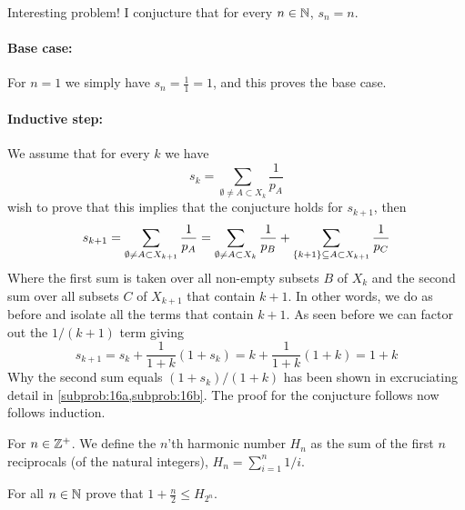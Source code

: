 \documentclass[a4paper, english, 12pt]{article} %
\begin{document}
\begin{answer}
  Interesting problem! I conjucture that for every $n \in \mathbb{N}$, $s_n = n$.
  \paragraph{Base case:} For $n = 1$ we simply have $s_n = \frac{1}{1} = 1$, and
  this proves the base case.
  \paragraph{Inductive step:} We assume that for every $k$ we have
  \begin{equation*}
    s_k = \sum_{\emptyset \neq A \subset X_k} \frac{1}{p_A} 
  \end{equation*}
  wish to prove that this implies that the conjucture holds for $s_{k+1}$, then
  \begin{equation*}
    s_{k+1}
      = \sum_{\emptyset \neq A \subset X_{k+1}} \frac{1}{p_A}
      = \sum_{\emptyset \neq A \subset X_{k}} \frac{1}{p_B} + \sum_{\{k+1\} \subseteq A \subset X_{k+1}} \frac{1}{p_C}\\ 
  \end{equation*}
  Where the first sum is taken over all non-empty subsets $B$ of $X_k$ and the
  second sum over all subsets $C$ of $X_{k+1}$ that contain $k+1$. In other
  words, we do as before and isolate all the terms that contain $k+1$. As seen
  before we can factor out the $1/(k+1)$ term giving
  \begin{equation*}
    s_{k+1}
    = s_k + \frac{1}{1+k} (1 + s_k) = k + \frac{1}{1+k}(1+k) = 1 + k
  \end{equation*}
  Why the second sum equals $(1+s_k)/(1+k)$ has been shown in excruciating
  detail in
  \cref{subprob:16a,subprob:16b}. The proof for the conjucture follows now follows induction.
\end{answer}

\begin{problem}
  For $n \in \mathbb{Z}^+$. We define the $n$'th harmonic number $H_n$ as the sum
  of the first $n$ reciprocals (of the natural integers),  $H_n = \sum_{i=1}^n 1/i$.
\end{problem}

\begin{subproblem}
  For all $n \in \mathbb{N}$ prove that $1 + \frac{n}{2} \leq H_{2^n}$.
\end{subproblem}
\end{document}
